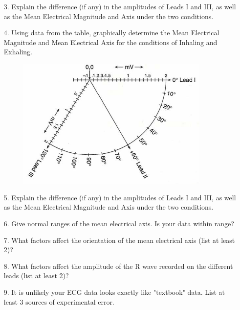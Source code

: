 \documentclass{article}
\begin{document}
\begin{itemize}
	\item[3.] Explain the difference (if any) in the amplitudes of Leads I and III, as well as the Mean Electrical Magnitude and Axis under the two conditions.\vspace{5cm}
	\item[4.] Using data from the table, graphically determine the Mean Electrical Magnitude and Mean Electrical Axis for the conditions of Inhaling and Exhaling.
	\begin{figure}[h]
	\centering\includegraphics[width=0.9\textwidth]{../images/ECG_II_7.jpg}
		\label{boxes}
		\end{figure}
		
	\item[5.] Explain the difference (if any) in the amplitudes of Leads I and III, as well as the Mean Electrical Magnitude and Axis under the two conditions.\vspace{5cm}
	\item[6.] Give normal ranges of the mean electrical axis. Is your data within range?\vspace{3cm}
	\item[7.] What factors affect the orientation of the mean electrical axis (list at least 2)?\vspace{4cm}
	\item[8.] What factors affect the amplitude of the R wave recorded on the different leads (list at least 2)?\vspace{4cm}
	\item[9.] It is unlikely your ECG data looks exactly like "textbook" data. List at least 3 sources of experimental error.
\end{itemize}
\end{document}

